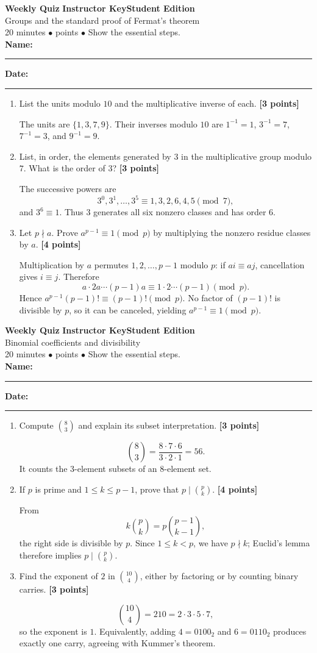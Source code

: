\documentclass[11pt]{article}
\newcounter{quiznum}
\newcommand{\edition}{\ifanswers Instructor Key\else Student Edition\fi}
\newcommand{\points}[1]{\hfill{\small\color{coral}\textbf{[#1 points]}}}
\newcommand{\quizheading}[1]{%
  \clearpage\stepcounter{quiznum}%
  \begin{tcolorbox}[
    enhanced,colback=paper,colframe=navy,boxrule=1.1pt,arc=2mm,
    left=4mm,right=4mm,top=2.5mm,bottom=2.5mm,
    borderline west={4pt}{0pt}{teal}]
    {\Large\bfseries\color{navy}Weekly Quiz \thequiznum}\hfill
    {\bfseries\color{teal}\edition}\\[-1pt]
    {\large\color{ink}#1}\\[2pt]
    {\small\color{muted}20 minutes \quad $\bullet$ \quad 10 points \quad $\bullet$ \quad Show the essential steps.}
    \ifanswers\else
      \\[5pt]\textbf{Name:}\ \rule{0.48\linewidth}{0.4pt}\hfill
      \textbf{Date:}\ \rule{0.20\linewidth}{0.4pt}
    \fi
  \end{tcolorbox}
}
\begin{document}
\quizheading{Groups and the standard proof of Fermat's theorem}
\begin{enumerate}
  \item List the units modulo $10$ and the multiplicative inverse of each. \points{3}
  \begin{solution}[1.05in]
    The units are $\{1,3,7,9\}$. Their inverses modulo $10$ are
    $1^{-1}=1$, $3^{-1}=7$, $7^{-1}=3$, and $9^{-1}=9$.
  \end{solution}

  \item List, in order, the elements generated by $3$ in the multiplicative group
  modulo $7$. What is the order of $3$? \points{3}
  \begin{solution}[1.2in]
    The successive powers are
    \[
      3^0,3^1,\ldots,3^5\equiv1,3,2,6,4,5\pmod7,
    \]
    and $3^6\equiv1$. Thus $3$ generates all six nonzero classes and has order $6$.
  \end{solution}

  \item Let $p\nmid a$. Prove $a^{p-1}\equiv1\pmod p$ by multiplying the nonzero
  residue classes by $a$. \points{4}
  \begin{solution}[1.55in]
    Multiplication by $a$ permutes $1,2,\ldots,p-1$ modulo $p$: if
    $ai\equiv aj$, cancellation gives $i\equiv j$. Therefore
    \[
      a\cdot2a\cdots(p-1)a\equiv1\cdot2\cdots(p-1)\pmod p.
    \]
    Hence $a^{p-1}(p-1)!\equiv(p-1)!\pmod p$. No factor of $(p-1)!$ is divisible
    by $p$, so it can be canceled, yielding $a^{p-1}\equiv1\pmod p$.
  \end{solution}
\end{enumerate}

\quizheading{Binomial coefficients and divisibility}
\begin{enumerate}
  \item Compute $\binom83$ and explain its subset interpretation. \points{3}
  \begin{solution}[1.05in]
    \[
      \binom83=\frac{8\cdot7\cdot6}{3\cdot2\cdot1}=56.
    \]
    It counts the $3$-element subsets of an $8$-element set.
  \end{solution}

  \item If $p$ is prime and $1\le k\le p-1$, prove that
  $p\mid\binom pk$. \points{4}
  \begin{solution}[1.5in]
    From
    \[
      k\binom pk=p\binom{p-1}{k-1},
    \]
    the right side is divisible by $p$. Since $1\le k<p$, we have $p\nmid k$;
    Euclid's lemma therefore implies $p\mid\binom pk$.
  \end{solution}

  \item Find the exponent of $2$ in $\binom{10}{4}$, either by factoring or by
  counting binary carries. \points{3}
  \begin{solution}[1.2in]
    \[
      \binom{10}{4}=210=2\cdot3\cdot5\cdot7,
    \]
    so the exponent is $1$. Equivalently, adding $4=0100_2$ and $6=0110_2$
    produces exactly one carry, agreeing with Kummer's theorem.
  \end{solution}
\end{enumerate}
\end{document}
